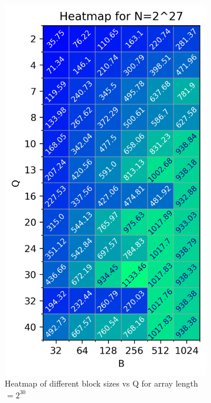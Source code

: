 \documentclass[twocolumn]{article}
\begin{document}
\begin{figure}[h]
\begin{subfigure}{0.31\linewidth}
        \includegraphics[width=\linewidth]{report/plots/heatmap_BvQ_N=28.png}
        \caption{Heatmap of different block sizes vs Q for array length $=2^{30}$}
        \label{fig:heatmap-n}
    \end{subfigure}
    \begin{subfigure}{0.68\linewidth}

\end{subfigure}
\end{figure}
\end{document}
